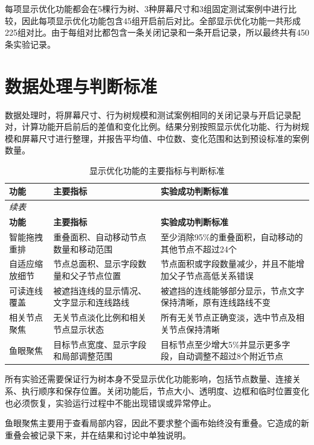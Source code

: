 \documentclass[11pt,a4paper,oneside,extrafontsizes]{memoir}
\begin{document}
每项显示优化功能都会在5棵行为树、3种屏幕尺寸和3组固定测试案例中进行比较，因此每项显示优化功能包含45组开启前后对比。全部显示优化功能一共形成225组对比。由于每组对比都包含一条关闭记录和一条开启记录，所以最终共有450条实验记录。

\section{数据处理与判断标准}

数据处理时，将屏幕尺寸、行为树规模和测试案例相同的关闭记录与开启记录配对，计算功能开启前后的差值和变化比例。结果分别按照显示优化功能、行为树规模和屏幕尺寸进行整理，并报告平均值、中位数、变化范围和达到预设标准的案例数量。

\begin{center}
\small
\begin{longtable}{@{}p{} p{} p{}@{}}
\caption{显示优化功能的主要指标与判断标准}\label{tab:auto-4}\\
\toprule
\textbf{功能} & \textbf{主要指标} & \textbf{实验成功判断标准} \\
\midrule
\endfirsthead
\multicolumn{3}{l}{\small\itshape 续表}\\
\toprule
\textbf{功能} & \textbf{主要指标} & \textbf{实验成功判断标准} \\
\midrule
\endhead
智能拖拽重排 & 重叠面积、自动移动节点数量和移动范围 & 至少消除95\%的重叠面积，自动移动的其他节点不超过24个 \\
自适应缩放细节 & 节点总面积、显示字段数量和父子节点位置 & 节点面积或字段数量减少，并且不能增加父子节点高低关系错误 \\
可读连线覆盖 & 被遮挡连线的显示情况、文字显示和连线路线 & 被遮挡的连线能够部分显示，节点文字保持清晰，原有连线路线不变 \\
相关节点聚焦 & 无关节点淡化比例和相关节点显示状态 & 所有无关节点正确变淡，选中节点及相关节点保持清晰 \\
鱼眼聚焦 & 目标节点宽度、显示字段和局部调整范围 & 目标节点至少增大5\%并显示更多字段，自动调整不超过8个附近节点 \\
\bottomrule
\end{longtable}
\end{center}

所有实验还需要保证行为树本身不受显示优化功能影响，包括节点数量、连接关系、执行顺序和保存位置。关闭功能后，节点大小、透明度、边框和临时位置变化也必须恢复，实验运行过程中不能出现错误或异常停止。

鱼眼聚焦主要用于查看局部内容，因此不要求整个画布始终没有重叠。它造成的新重叠会被记录下来，并在结果和讨论中单独说明。
\end{document}
